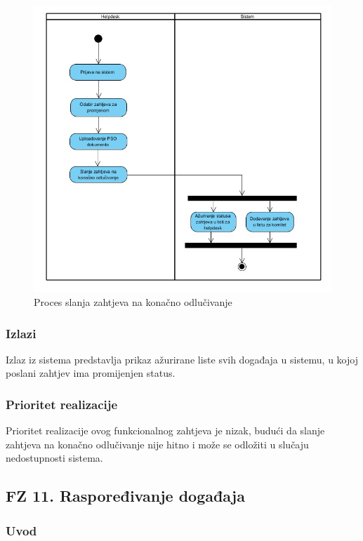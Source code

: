 \documentclass[12pt,a4paper]{article}
\begin{document}
\begin{figure}[H]
\center
\includegraphics[scale=0.5]{../res/Activity/activity10.JPG}
\caption{Proces slanja zahtjeva na konačno odlučivanje}
\label{act10}
\end{figure}

\subsubsection{Izlazi}

Izlaz iz sistema predstavlja prikaz ažurirane liste svih događaja u sistemu, u kojoj poslani zahtjev ima promijenjen status.

\subsubsection{Prioritet realizacije}

Prioritet realizacije ovog funkcionalnog zahtjeva je nizak, budući da slanje zahtjeva na konačno odlučivanje nije hitno i može se odložiti u slučaju nedostupnosti sistema.

\subsection{FZ 11. Raspoređivanje događaja}

\subsubsection{Uvod}
\end{document}
